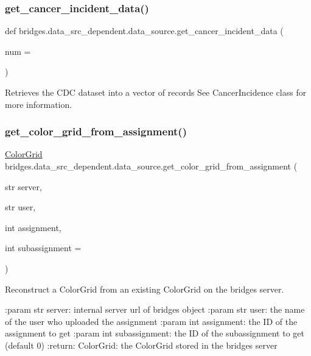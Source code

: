 \subsubsection{\texorpdfstring{get\_cancer\_incident\_data()}{get\_cancer\_incident\_data()}}
{\footnotesize\ttfamily def bridges.\+data\+\_\+src\+\_\+dependent.\+data\+\_\+source.\+get\+\_\+cancer\+\_\+incident\+\_\+data (\begin{DoxyParamCaption}\item[{}]{num = {} }\end{DoxyParamCaption})}



Retrieves the C\+DC dataset into a vector of records See Cancer\+Incidence class for more information. 

\mbox{\label{namespacebridges_1_1data__src__dependent_1_1data__source_a57f25e815efe350687cc774010ad0083}} 
\subsubsection{\texorpdfstring{get\_color\_grid\_from\_assignment()}{get\_color\_grid\_from\_assignment()}}
{\footnotesize\ttfamily  \mbox{\hyperlink{classbridges_1_1color__grid_1_1_color_grid}{Color\+Grid}} bridges.\+data\+\_\+src\+\_\+dependent.\+data\+\_\+source.\+get\+\_\+color\+\_\+grid\+\_\+from\+\_\+assignment (\begin{DoxyParamCaption}\item[{str}]{server,  }\item[{str}]{user,  }\item[{int}]{assignment,  }\item[{int }]{subassignment = {} }\end{DoxyParamCaption})}



Reconstruct a Color\+Grid from an existing Color\+Grid on the bridges server. 

\+:param str server\+: internal server url of bridges object \+:param str user\+: the name of the user who uploaded the assignment \+:param int assignment\+: the ID of the assignment to get \+:param int subassignment\+: the ID of the subassignment to get (default 0) \+:return\+: Color\+Grid\+: the Color\+Grid stored in the bridges server \mbox{\label{namespacebridges_1_1data__src__dependent_1_1data__source_a0d2a8b28fa0fa79440112d02ca9cd7fc}} 
